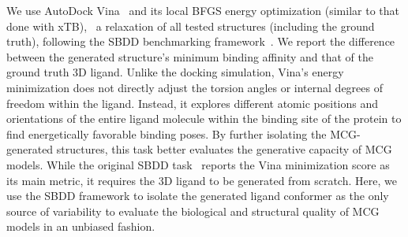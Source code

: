 We use AutoDock Vina~\citep{vina} and its local BFGS energy optimization (similar to that done with xTB), \ie\ a relaxation of all tested structures (including the ground truth), following the SBDD benchmarking framework~\cite{targetdiff}. We report the difference between the generated structure’s minimum binding affinity and that of the ground truth 3D ligand. 
Unlike the docking simulation, Vina's energy minimization does not directly adjust the torsion angles or internal degrees of freedom within the ligand. Instead, it explores different atomic positions and orientations of the entire ligand molecule within the binding site of the protein to find energetically favorable binding poses. 
By further isolating the MCG-generated structures, this task better evaluates the generative capacity of MCG models. %
While the original SBDD task~\citep{pocket2mol, targetdiff} reports the Vina minimization score as its main metric, it requires the 3D ligand to be generated from scratch. Here, we use the SBDD framework to isolate the generated ligand conformer as the only source of variability to evaluate the biological and structural quality of MCG models in an unbiased fashion. 

\vspace{-1ex}
